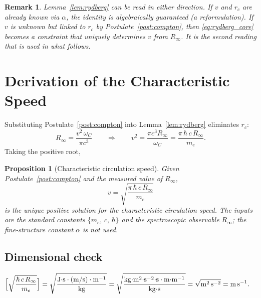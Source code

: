 \documentclass[aps,pra,preprint,longbibliography,nofootinbib]{revtex4-2}
\newtheorem{proposition}{Proposition}
\newtheorem{remark}{Remark}
\newcommand{\vc}{v}              %
\newcommand{\rc}{r_c}            %
\newcommand{\omC}{\omega_C}      %
\newcommand{\Rinf}{R_\infty}     %
\begin{document}
\begin{remark}
Lemma~\ref{lem:rydberg} can be read in either direction.
If $\vc$ and $\rc$ are already known via $\alpha$, the identity is
algebraically guaranteed (a reformulation).
If $\vc$ is \emph{unknown} but linked to $\rc$ by
Postulate~\ref{post:compton}, then \eqref{eq:rydberg_core} becomes
a constraint that uniquely determines $\vc$ from $\Rinf$.
It is the second reading that is used in what follows.
\end{remark}

\section{Derivation of the Characteristic Speed}
\label{sec:derivation}

Substituting Postulate~\ref{post:compton} into Lemma~\ref{lem:rydberg}
eliminates $\rc$:
\begin{equation}
  \Rinf = \frac{\vc^2\,\omC}{\pi c^3}
  \qquad\Longrightarrow\qquad
  \vc^2 = \frac{\pi c^3 \Rinf}{\omC}
         = \frac{\pi\,\hbar\,c\,\Rinf}{m_e}.
  \label{eq:vc_solve}
\end{equation}
Taking the positive root,

\begin{proposition}[Characteristic circulation speed]
\label{prop:vc}
Given Postulate~\ref{post:compton} and the measured value of $\Rinf$,
\begin{equation}
  \boxed{
    \vc = \sqrt{\frac{\pi\,\hbar\,c\,\Rinf}{m_e}}
  }
  \label{eq:vc}
\end{equation}
is the unique positive solution for the characteristic circulation
speed.
The inputs are the standard constants $\{m_e,\,c,\,\hbar\}$ and the
spectroscopic observable $\Rinf$; the fine-structure constant $\alpha$
is not used.
\end{proposition}

\subsection{Dimensional check}
\begin{align}
  \Bigl[\sqrt{\frac{\hbar\,c\,\Rinf}{m_e}}\Bigr]
  &= \sqrt{\frac{\mathrm{J{\cdot}s}\cdot(\mathrm{m/s})\cdot\mathrm{m}^{-1}}
                {\mathrm{kg}}}
  = \sqrt{\frac{\mathrm{kg{\cdot}m^2{\cdot}s^{-2}{\cdot}s\cdot m{\cdot}m^{-1}}}
               {\mathrm{kg{\cdot}s}}}
  = \sqrt{\mathrm{m^2\,s^{-2}}}
  = \mathrm{m\,s^{-1}}. \notag
\end{align}
\end{document}
